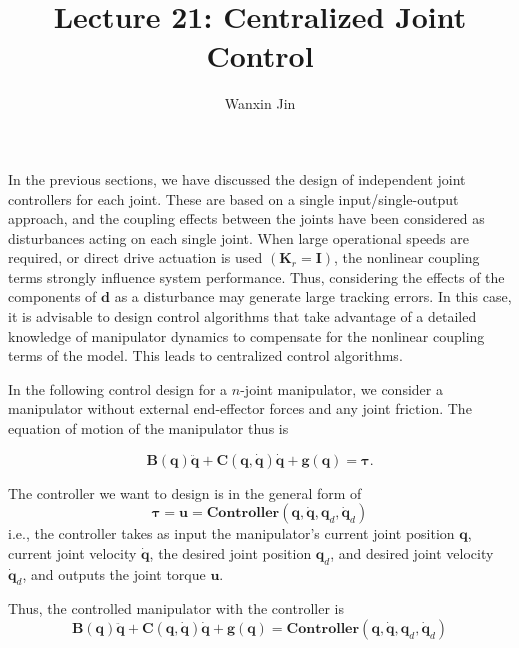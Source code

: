 \documentclass[10pt]{article}
\begin{document}
\title{Lecture 21: Centralized Joint Control}
\author{Wanxin Jin}
\maketitle

In the previous sections, we have discussed the design of  independent joint controllers  for each joint. These are based on a single input/single-output approach, and the coupling effects between
the joints have been considered as disturbances acting on each single joint. When large operational speeds are required, or direct drive actuation is used $\left(\boldsymbol{K}_{r}=\boldsymbol{I}\right)$, the nonlinear coupling terms strongly influence system performance. Thus, considering the effects of the components of $\boldsymbol{d}$ as a disturbance may generate large tracking errors. In this case, it is advisable to design control algorithms that take advantage of a detailed knowledge of manipulator dynamics to compensate for the nonlinear coupling terms of the model. This leads to centralized control algorithms.


In the following control design for a $n$-joint manipulator, we consider a manipulator without external end-effector forces  and  any joint friction.   The equation of motion of the manipulator thus is 

\begin{equation}\label{equ.manipulator}
    \boldsymbol{B}(\boldsymbol{q}) \ddot{\boldsymbol{q}}+\boldsymbol{C}(\boldsymbol{q}, \dot{\boldsymbol{q}}) \dot{\boldsymbol{q}}+\boldsymbol{g}(\boldsymbol{q})=\boldsymbol{\tau}.
\end{equation}

The controller we want to design is in the general form of 
\begin{equation}\label{equ.controller}
\boldsymbol{\tau}=\boldsymbol{u}=\textbf{Controller}(\boldsymbol{q}, \boldsymbol{\dot{q}}, \boldsymbol{q}_d, \boldsymbol{\dot{q}}_d)
\end{equation}
i.e., the controller takes as input the manipulator's current joint position $\boldsymbol{q}$, current joint velocity $\boldsymbol{\dot{q}}$, the desired joint position $\boldsymbol{q}_d$, and desired joint velocity $\boldsymbol{\dot{q}}_d$, and outputs the joint torque $\boldsymbol{u}$.

Thus, the controlled manipulator  with the controller  is 
\begin{equation}\label{equ.manipulator_control}
    \boldsymbol{B}(\boldsymbol{q}) \ddot{\boldsymbol{q}}+\boldsymbol{C}(\boldsymbol{q}, \dot{\boldsymbol{q}}) \dot{\boldsymbol{q}}+\boldsymbol{g}(\boldsymbol{q})=\textbf{Controller}(\boldsymbol{q}, \boldsymbol{\dot{q}}, \boldsymbol{q}_d, \boldsymbol{\dot{q}}_d)
\end{equation}
\end{document}
